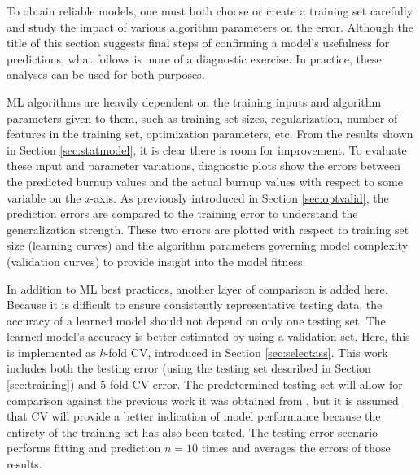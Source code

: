To obtain reliable models, one must both choose or create a training set
carefully and study the impact of various algorithm parameters on the error.
Although the title of this section suggests final steps of confirming a model's
usefulness for predictions, what follows is more of a diagnostic exercise. 
In practice, these analyses can be used for both purposes.

\gls{ML} algorithms are heavily dependent on the training inputs and algorithm
parameters given to them, such as training set sizes, regularization, number of
features in the training set, optimization parameters, etc.  From the results
shown in Section \ref{sec:statmodel}, it is clear there is room for
improvement.  To evaluate these input and parameter variations, diagnostic
plots show the errors between the predicted burnup values and the actual burnup
values with respect to some variable on the \textit{x}-axis.  As previously
introduced in Section \ref{sec:optvalid}, the prediction errors are compared to
the training error to understand the generalization strength. These two errors
are plotted with respect to training set size (learning curves) and the
algorithm parameters governing model complexity (validation curves) to provide
insight into the model fitness. 

In addition to \gls{ML} best practices, another layer of comparison is added
here.  Because it is difficult to ensure consistently representative testing
data, the accuracy of a learned model should not depend on only one testing
set.  The learned model's accuracy is better estimated by using a validation
set. Here, this is implemented as \textit{k}-fold \gls{CV}, introduced
in Section \ref{sec:selectass}. This work includes both the testing error
(using the testing set described in Section \ref{sec:training}) and $5$-fold
\gls{CV} error. The predetermined testing set will allow for comparison
against the previous work it was obtained from \cite{dayman_feasibility_2013},
but it is assumed that \gls{CV} will provide a better indication of
model performance because the entirety of the training set has also been
tested.  The testing error scenario performs fitting and prediction $n=10$
times and averages the errors of those results.

